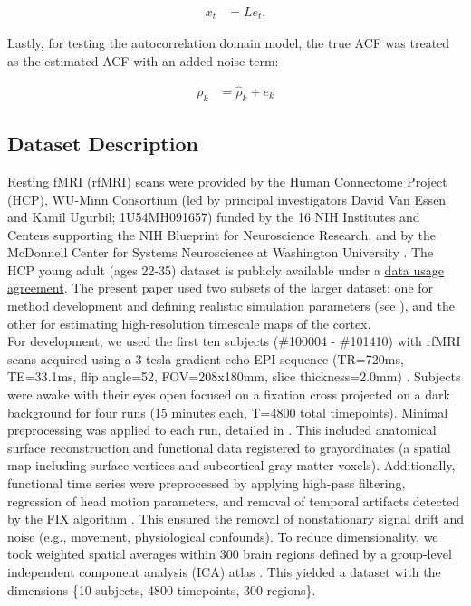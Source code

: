 \documentclass[main.tex]{subfiles}
\begin{document}
\begin{align}
    x_t &= L e_t.
\end{align}

\noindent Lastly, for testing the autocorrelation domain model, the true ACF was treated as the estimated ACF with an added noise term:

\begin{align}
    \rho_k &= \hat\rho_k + e_k
\end{align}

\subsection{Dataset Description}\label{sec:dataset-description}

Resting fMRI (rfMRI) scans were provided by the Human Connectome Project (HCP), WU-Minn Consortium (led by principal investigators David Van Essen and Kamil Ugurbil; 1U54MH091657) funded by the 16 NIH Institutes and Centers supporting the NIH Blueprint for Neuroscience Research, and by the McDonnell Center for Systems Neuroscience at Washington University \citep{van_essen_wu-minn_2013}. The HCP young adult (ages 22-35) dataset is publicly available under a \href{https://www.humanconnectome.org/storage/app/media/data_use_terms/DataUseTerms-HCP-Open-Access-26Apr2013.pdf}{data usage agreement}. The present paper used two subsets of the larger dataset: one for method development and defining realistic simulation parameters (see ), and the other for estimating high-resolution timescale maps of the cortex.\\

For development, we used the first ten subjects (\#100004 - \#101410) with rfMRI scans acquired using a 3-tesla gradient-echo EPI sequence (TR=720ms, TE=33.1ms, flip angle=52\textdegree, FOV=208x180mm, slice thickness=2.0mm) \citep{van_essen_wu-minn_2013}. Subjects were awake with their eyes open focused on a fixation cross projected on a dark background for four runs (15 minutes each, T=4800 total timepoints). Minimal preprocessing was applied to each run, detailed in \citep{glasser_minimal_2013}. This included anatomical surface reconstruction \citep{robinson_msm_2014} and functional data registered to grayordinates (a spatial map including surface vertices and subcortical gray matter voxels). Additionally, functional time series were preprocessed by applying high-pass filtering, regression of head motion parameters, and removal of temporal artifacts detected by the FIX algorithm \citep{salimi-khorshidi_automatic_2014}. This ensured the removal of nonstationary signal drift and noise (e.g., movement, physiological confounds). To reduce dimensionality, we took weighted spatial averages within 300 brain regions defined by a group-level independent component analysis (ICA) atlas \citep{smith_resting-state_2013}. This yielded a dataset with the dimensions \{10 subjects, 4800 timepoints, 300 regions\}.\\
\end{document}
